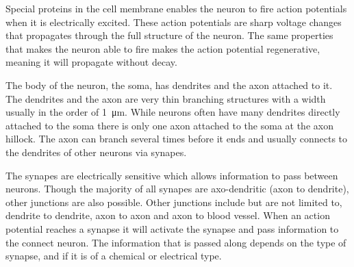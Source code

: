\documentclass[altfont, fleqn]{uiophd}
\begin{document}
Special proteins in the cell membrane enables the neuron to
fire action potentials when it is electrically excited. 
These action potentials are sharp voltage changes that propagates through
the full structure of the neuron.
The same properties that makes the neuron able to fire makes 
the action potential {regenerative}, meaning it will propagate
without decay.

The body of the neuron, the {soma}, has {dendrites} and 
the axon attached to it. 
The dendrites and the axon are very thin branching structures 
with a width usually in the order of \SI{1}{\micro\metre}. 
While neurons often have many dendrites directly attached to the soma
there is only one axon attached to the soma at the axon hillock.
The axon can branch several times before it ends and 
usually connects to the dendrites of other neurons via synapes.

The synapes are electrically sensitive which allows information
to pass between neurons. 
Though the majority of all synapes are axo-dendritic 
(axon to dendrite),
other junctions are also possible.
Other junctions include but are not limited to,
dendrite to dendrite, 
axon to axon and 
axon to blood vessel. 
When an action potential reaches a synapse it will activate
the synapse and pass information to the connect neuron. 
The information that is passed along depends on the type of synapse,
and if it is of a chemical or electrical type.


\end{document}

